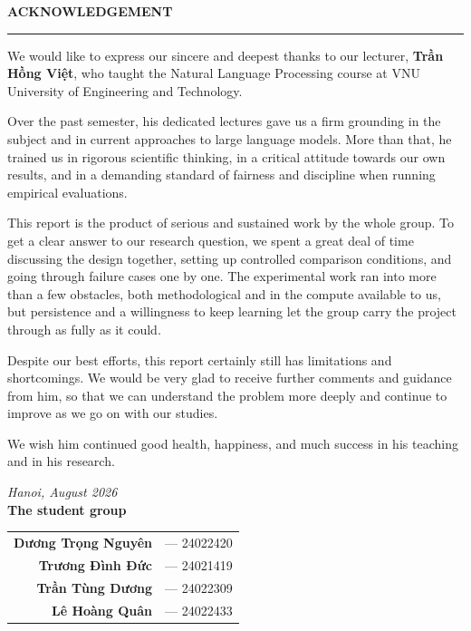 \documentclass[11pt,a4paper]{article}
\begin{document}
\newpage
\thispagestyle{empty}
\vspace*{1.5cm}

\begin{center}
  {\LARGE\bfseries ACKNOWLEDGEMENT\par}
  \vspace{10pt}
  \rule{0.3\linewidth}{0.6pt}\par
\end{center}
\vspace{1.2cm}

We would like to express our sincere and deepest thanks to our lecturer, \textbf{Trần Hồng Việt}, who taught the Natural Language Processing course at VNU University of Engineering and Technology.

Over the past semester, his dedicated lectures gave us a firm grounding in the subject and in current approaches to large language models. More than that, he trained us in rigorous scientific thinking, in a critical attitude towards our own results, and in a demanding standard of fairness and discipline when running empirical evaluations.

This report is the product of serious and sustained work by the whole group. To get a clear answer to our research question, we spent a great deal of time discussing the design together, setting up controlled comparison conditions, and going through failure cases one by one. The experimental work ran into more than a few obstacles, both methodological and in the compute available to us, but persistence and a willingness to keep learning let the group carry the project through as fully as it could.

Despite our best efforts, this report certainly still has limitations and shortcomings. We would be very glad to receive further comments and guidance from him, so that we can understand the problem more deeply and continue to improve as we go on with our studies.

We wish him continued good health, happiness, and much success in his teaching and in his research.

\vspace{1.8cm}
\begin{flushright}
\textit{Hanoi, August 2026}\\[6pt]
\textbf{The student group}\\[8pt]
\begin{tabular}{rl}
\textbf{Dương Trọng Nguyên} & --- 24022420\\
\textbf{Trương Đình Đức}    & --- 24021419\\
\textbf{Trần Tùng Dương}    & --- 24022309\\
\textbf{Lê Hoàng Quân}      & --- 24022433
\end{tabular}
\end{flushright}
\end{document}
